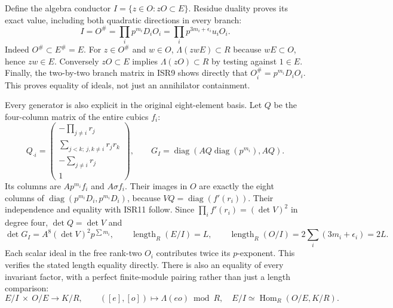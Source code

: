 \documentclass[11pt]{article}
\begin{document}
Define the algebra conductor $I=\{z\in O:zO\subset E\}$.
Residue duality proves its exact value, including both quadratic
directions in every branch:
\begin{equation}
 I=O^\#=\prod_i p^{m_i}D_iO_i
   =\prod_i p^{3m_i+\epsilon_i}u_iO_i.                  \tag{ISR11}
\end{equation}
Indeed $O^\#\subset E^\#=E$. For $z\in O^\#$ and $w\in O$,
$\Lambda(zwE)\subset R$ because $wE\subset O$, hence $zw\in E$.
Conversely $zO\subset E$ implies $\Lambda(zO)\subset R$ by testing
against $1\in E$. Finally, the two-by-two branch matrix in ISR9
shows directly that $O_i^\#=p^{m_i}D_iO_i$. This proves equality
of ideals, not just an annihilator containment.

Every generator is also explicit in the original eight-element
basis. Let $Q$ be the four-column matrix of the entire cubics $f_i$:
\begin{equation}
 Q_{\cdot i}=\begin{pmatrix}
 -\prod_{j\ne i}r_j\\\sum_{j<k;\ j,k\ne i}r_jr_k\\
 -\sum_{j\ne i}r_j\\1
 \end{pmatrix},\qquad
 G_I=\operatorname{diag}(A Q\operatorname{diag}(p^{m_i}),A Q).
                                                               \tag{ISR12}
\end{equation}
Its columns are $Ap^{m_i}f_i$ and $A\sigma f_i$. Their images in
$O$ are exactly the eight columns of
$\operatorname{diag}(p^{m_i}D_i,p^{m_i}D_i)$, because
$VQ=\operatorname{diag}(f'(r_i))$. Their independence and equality
with ISR11 follow. Since $\prod_i f'(r_i)=(\det V)^2$ in degree
four, $\det Q=\det V$ and
\begin{equation}
 \det G_I=A^8(\det V)^2p^{\sum m_i},\qquad
 \operatorname{length}_R(E/I)=L,\qquad
 \operatorname{length}_R(O/I)=2\sum_i(3m_i+\epsilon_i)=2L.
                                                               \tag{ISR13}
\end{equation}
Each scalar ideal in the free rank-two $O_i$ contributes twice its
$p$-exponent. This verifies the stated length equality directly.
There is also an equality of every invariant factor, with a perfect
finite-module pairing rather than just a length comparison:
\begin{equation}
 E/I\ \times\ O/E\longrightarrow K/R,\qquad
 ([e],[o])\longmapsto\Lambda(eo)\bmod R,
 \quad E/I\simeq\operatorname{Hom}_R(O/E,K/R).
                                                               \tag{ISR13a}
\end{equation}
\end{document}
